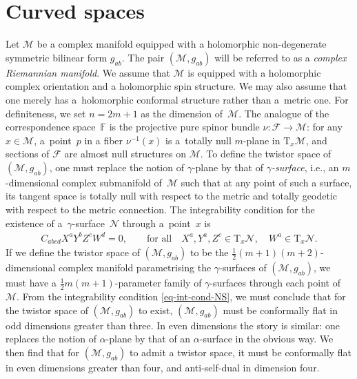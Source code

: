 \documentclass[10pt,a4paper]{amsart}
\numberwithin{equation}{section}
\newcommand{\mc} [1]{\mathcal{#1}}
\newcommand{\Tgt} {\mathrm{T}}
\newcommand{\F} {\mathbb{F}}
\begin{document}
\section{Curved spaces}\label{sec-curved}
Let $\mc{M}$ be a complex manifold equipped with a holomorphic non-degenerate symmetric bi\-li\-near form $g_{ab}$. The pair $(\mc{M},g_{ab})$ will be referred to as a \emph{complex Riemannian manifold}. We assume that $\mc{M}$ is equipped with a holomorphic complex orientation and a holomorphic spin structure. We may also assume that one merely has a~holomorphic conformal structure rather than a~metric one. For def\/initeness, we set $n=2m+1$ as the dimension of~$\mc{M}$. The analogue of the correspondence space~$\F$ is the projective pure spinor bundle $\nu\colon \mc{F} \rightarrow \mc{M}$: for any $x \in \mc{M}$, a~point~$p$ in a f\/iber $\nu^{-1}(x)$ is a~totally null $m$-plane in $\Tgt_x \mc{M}$, and sections of $\mc{F}$ are almost null structures on $\mc{M}$. To def\/ine the twistor space of $(\mc{M},g_{ab})$, one must replace the notion of $\gamma$-plane by that of \emph{$\gamma$-surface}, i.e., an $m$-dimensional complex submanifold of~$\mc{M}$ such that at any point of such a surface, its tangent space is totally null with respect to the metric and totally geodetic with respect to the metric connection. The integrability condition for the existence of a~$\gamma$-surface~$\mc{N}$ through a~point~$x$ is~\cite{Taghavi-Chabert2013}
\begin{gather}\label{eq-int-cond-NS}
C_{abcd} X^a Y^b Z^c W^d = 0 , \qquad \text{for all} \quad X^a, Y^a, Z^c \in \Tgt_x \mc{N}, \quad W^a \in \Tgt_x \mc{N}.
\end{gather}
If we def\/ine the twistor space of $(\mc{M},g_{ab})$ to be the $\frac{1}{2}(m+1)(m+2)$-dimensional complex manifold parametrising the $\gamma$-surfaces of $(\mc{M},g_{ab})$, we must have a $\frac{1}{2}m(m+1)$-parameter family of $\gamma$-surfaces through each point of $\mc{M}$. From the integrability condition \eqref{eq-int-cond-NS}, we must conclude that for the twistor space of $(\mc{M},g_{ab})$ to exist, $(\mc{M},g_{ab})$ must be conformally f\/lat in odd dimensions greater than three. In even dimensions the story is similar: one replaces the notion of $\alpha$-plane by that of an $\alpha$-surface in the obvious way. We then f\/ind that for $(\mc{M},g_{ab})$ to admit a twistor space, it must be conformally f\/lat in even dimensions greater than four, and anti-self-dual in dimension four.
\end{document}
